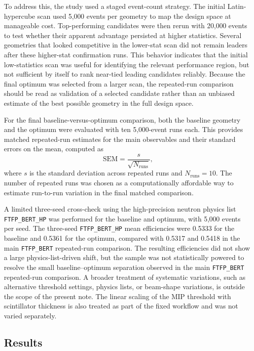 \noindent To address this, the study used a staged event-count strategy. The initial Latin-hypercube scan used 5,000 events per geometry to map the design space at manageable cost.
Top-performing candidates were then rerun with 20,000 events to test whether their apparent advantage persisted at higher statistics. Several geometries that looked competitive in
the lower-stat scan did not remain leaders after these higher-stat confirmation runs. This behavior indicates that the initial low-statistics scan was useful for identifying the relevant performance region, but not sufficient by itself to rank near-tied leading candidates reliably. Because the final optimum was selected from a larger scan, the repeated-run comparison should be read as validation of a selected candidate rather than an unbiased estimate of the best possible geometry in the full design space.

\noindent For the final baseline-versus-optimum comparison, both the baseline geometry and the optimum were evaluated with ten 5,000-event runs each. This provides matched repeated-run
estimates for the main observables and their standard errors on the mean, computed as
\[
\mathrm{SEM}=\frac{s}{\sqrt{N_{\mathrm{runs}}}},
\]
where $s$ is the standard deviation across repeated runs and $N_{\mathrm{runs}}=10$. The number of repeated runs was chosen as a computationally affordable way to estimate run-to-run variation in the
final matched comparison.

\noindent A limited three-seed cross-check using the high-precision neutron physics list \texttt{FTFP\_BERT\_HP} was performed for the baseline and optimum, with 5,000 events per seed. 
The three-seed \texttt{FTFP\_BERT\_HP} mean efficiencies were 0.5333 for the baseline and 0.5361 for the optimum, compared with 0.5317 and 0.5418 in the main \texttt{FTFP\_BERT} 
repeated-run comparison. The resulting efficiencies did not show a large physics-list-driven shift, but the sample was not statistically powered to resolve the small baseline--optimum 
separation observed in the main \texttt{FTFP\_BERT} repeated-run comparison. A broader treatment of systematic variations, such as alternative threshold settings, physics lists, 
or beam-shape variations, is outside the scope of the present note. The linear scaling of the MIP threshold with scintillator thickness is also treated as part of the fixed workflow 
and was not varied separately.


\subsection{Results}

